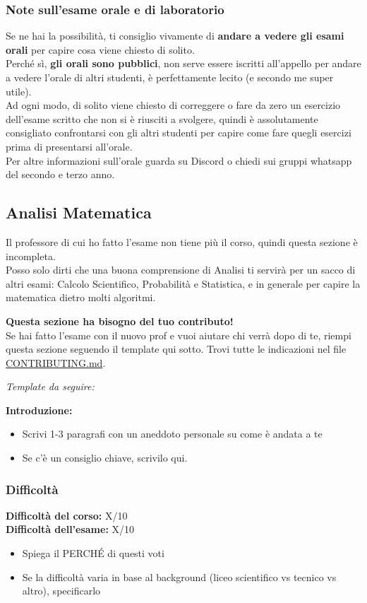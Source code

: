 \documentclass[18pt]{extarticle}
\begin{document}
\subsubsection{Note sull'esame orale e di laboratorio}
Se ne hai la possibilità, ti consiglio vivamente di \textbf{andare a vedere gli esami orali} per capire cosa viene chiesto di solito.\\
Perché sì, \textbf{gli orali sono pubblici}, non serve essere iscritti all'appello per andare a vedere l'orale di altri studenti, è perfettamente lecito (e secondo me super utile).\\
Ad ogni modo, di solito viene chiesto di correggere o fare da zero un esercizio dell'esame scritto che non si è riusciti a svolgere, quindi è assolutamente consigliato confrontarsi con gli altri studenti per capire come fare quegli esercizi prima di presentarsi all'orale.\\
Per altre informazioni sull'orale guarda su Discord o chiedi sui gruppi whatsapp del secondo e terzo anno.

\clearpage

\subsection{Analisi Matematica}
Il professore di cui ho fatto l'esame non tiene più il corso, quindi questa sezione è incompleta.\\
Posso solo dirti che una buona comprensione di Analisi ti servirà per un sacco di altri esami: Calcolo Scientifico, Probabilità e Statistica, e in generale per capire la matematica dietro molti algoritmi.

\textbf{Questa sezione ha bisogno del tuo contributo!}\\
Se hai fatto l'esame con il nuovo prof e vuoi aiutare chi verrà dopo di te, riempi questa sezione seguendo il template qui sotto. Trovi tutte le indicazioni nel file \href{https://github.com/Verryx-02/Scuola-di-sopravvivenza-per-studenti-di-Informatica/blob/main/CONTRIBUTING.md}{CONTRIBUTING.md}.

\textit{Template da seguire:}

\textbf{Introduzione:}
\begin{itemize}
\item Scrivi 1-3 paragrafi con un aneddoto personale su come è andata a te
\item Se c'è un consiglio chiave, scrivilo qui.
\end{itemize}

\subsubsection{Difficoltà}
\textbf{Difficoltà del corso:} X/10\\
\textbf{Difficoltà dell'esame:} X/10
\begin{itemize}
\item Spiega il PERCHÉ di questi voti
\item Se la difficoltà varia in base al background (liceo scientifico vs tecnico vs altro), specificarlo
\end{itemize}
\end{document}

